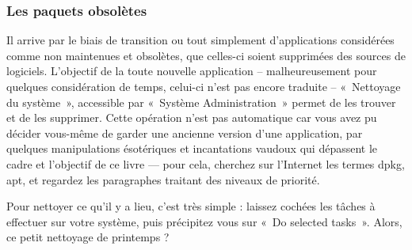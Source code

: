 {\subsubsection{Les paquets obsolètes}
\label{RefCleaner}
Il arrive par le biais de transition ou tout simplement d'applications considérées comme non maintenues et obsolètes, que celles-ci soient supprimées des sources de logiciels. L'objectif de la toute nouvelle application -- malheureusement pour quelques considération de temps, celui-ci n'est pas encore traduite -- «~Nettoyage du système~», accessible par «~Système \FlecheDroite Administration~» permet de les trouver et de les supprimer. Cette opération n'est pas automatique car vous avez pu décider vous-même de garder une ancienne version d'une application, par quelques manipulations ésotériques et incantations vaudoux qui dépassent le cadre et l'objectif de ce livre --- pour cela, cherchez sur l'Internet les termes dpkg, apt, et regardez les paragraphes traitant des niveaux de priorité.\par
Pour nettoyer ce qu'il y a lieu, c'est très simple : laissez cochées les tâches à effectuer sur votre système, puis précipitez vous sur «~Do selected tasks~». Alors, ce petit nettoyage de printemps ?
}

